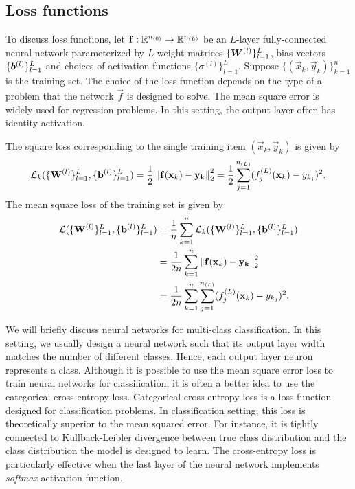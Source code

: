 \subsection{Loss functions}
To discuss loss functions, let $\mathbf{f} : {\mathbb R}^{n_{(0)}} \to {\mathbb R}^{n_{(L)}}$ be an $L$-layer fully-connected neural network parameterized by $L$ weight matrices $\{ \bm{W}^{(l)}  \}_{l=1}^{L}$, bias vectors $\{  \bm{b}^{(l)} \}_{l=1}^{L}$ and choices of activation functions $\{ \sigma^{(l)} \}_{l=1}^{L}$. Suppose $\{ (\vec{x}_k, \vec{y}_k) \}_{k=1}^n$ is the training set. The choice of the loss function depends on the type of a problem that the network $\vec{f}$ is designed to solve.
The mean square error is widely-used for regression problems. In this setting, the output layer often has identity activation.
\begin{definition}
The square loss corresponding to the single training item $ (\vec{x}_k, \vec{y}_k)$ is given by 
\begin{align*}
    \mathcal{L}_{k}(\{ \mathbf{W}^{(l)} \}_{l=1}^{L},\{ \mathbf{b}^{(l)} \}_{l=1}^{L}) = \frac{1}{2} \left\lVert\mathbf{f}(\mathbf{x}_k) - \mathbf{y_k}\right\rVert^{2}_2 = \frac{1}{2} \sum_{j = 1}^{n_{(L)}} (f^{(L)}_{j}(\mathbf{x}_k) - y_{k_{j}})^{2}.
\end{align*}
The mean square loss of the training set is given by
\begin{align*}
    \mathcal{L}(\{ \mathbf{W}^{(l)} \}_{l=1}^{L},\{ \mathbf{b}^{(l)} \}_{l=1}^{L}) &= \frac{1}{n} \sum_{k = 1}^n  \mathcal{L}_{k}(\{ \mathbf{W}^{(l)} \}_{l=1}^{L},\{ \mathbf{b}^{(l)} \}_{l=1}^{L} ) \\ 
    &= \frac{1}{2n} \sum_{k = 1}^n  \left\lVert\mathbf{f}(\mathbf{x}_k) - \mathbf{y_k}\right\rVert^{2}_2 \\
    &=  \frac{1}{2n} \sum_{k = 1}^n \sum_{j = 1}^{n_{(L)}} (f^{(L)}_{j}(\mathbf{x}_k) - y_{k_{j}})^{2}.
\end{align*}
\end{definition}
\pagebreak
We will briefly discuss neural networks for multi-class classification. In this setting, we usually design a neural network such that its output layer width matches the number of different classes. Hence, each output layer neuron represents a class.
Although it is possible to use the mean square error loss to train neural networks for classification, it is often a better idea to use the categorical cross-entropy loss. Categorical cross-entropy loss is a loss function designed for classification problems. In classification setting, this loss is theoretically superior to the mean squared error. For instance, it is tightly connected to Kullback-Leibler divergence between true class distribution and the class distribution the model is designed to learn. The cross-entropy loss is particularly effective when the last layer of the neural network implements \textit{softmax}\cite{bridle_training} activation function.
